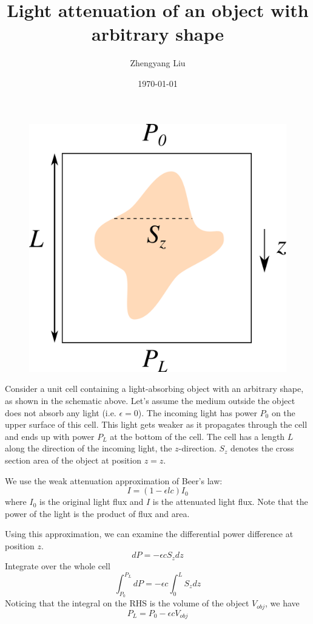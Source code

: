 \documentclass[onecolumn,aps, pre,amsmath,amssymb,longbibliography,11pt]{revtex4-2}
\begin{document}
\title{Light attenuation of an object with arbitrary shape}

\author{Zhengyang Liu}
\date{\today}
\maketitle

\begin{figure}[h]
  \begin{center}
    \includegraphics[width=5in]{Figures/schematic.png}
  \end{center}
\end{figure}

Consider a unit cell containing a light-absorbing object with an arbitrary shape, as shown in the schematic above. Let's assume the medium outside the object does not absorb any light (i.e. $\epsilon=0$). The incoming light has power $P_0$ on the upper surface of this cell. This light gets weaker as it propagates through the cell and ends up with power $P_L$ at the bottom of the cell. The cell has a length $L$ along the direction of the incoming light, the $z$-direction. $S_z$ denotes the cross section area of the object at position $z=z$.

We use the weak attenuation approximation of Beer's law:
$$
I = (1 - \epsilon lc) I_0
$$
where $I_0$ is the original light flux and $I$ is the attenuated light flux. Note that the power of the light is the product of flux and area.

Using this approximation, we can examine the differential power difference at position $z$.
$$
dP = -\epsilon c S_z dz
$$
Integrate over the whole cell
$$
\int_{P_0}^{P_L}dP = -\epsilon c \int_0^L S_z dz
$$
Noticing that the integral on the RHS is the volume of the object $V_{obj}$, we have
$$
P_L = P_0 - \epsilon c V_{obj}
$$
\end{document}

